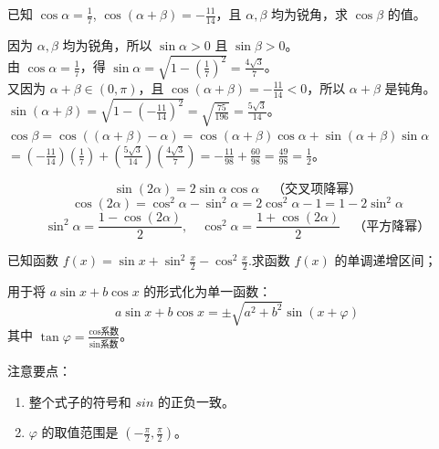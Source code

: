 \begin{example}
    已知 $\cos\alpha = \frac{1}{7}$, $\cos(\alpha+\beta)=-\frac{11}{14}$，且 $\alpha, \beta$ 均为锐角，求 $\cos\beta$ 的值。
\end{example}
\begin{solution}
    因为 $\alpha, \beta$ 均为锐角，所以 $\sin\alpha > 0$ 且 $\sin\beta > 0$。\\
    由 $\cos\alpha = \frac{1}{7}$，得 $\sin\alpha = \sqrt{1 - (\frac{1}{7})^2} = \frac{4\sqrt{3}}{7}$。\\
    又因为 $\alpha+\beta \in (0, \pi)$，且 $\cos(\alpha+\beta)=-\frac{11}{14} < 0$，所以 $\alpha+\beta$ 是钝角。\\
    $\sin(\alpha+\beta) = \sqrt{1 - (-\frac{11}{14})^2} = \sqrt{\frac{75}{196}} = \frac{5\sqrt{3}}{14}$。\\
    $\cos\beta = \cos((\alpha+\beta)-\alpha) = \cos(\alpha+\beta)\cos\alpha + \sin(\alpha+\beta)\sin\alpha$
    $= (-\frac{11}{14})(\frac{1}{7}) + (\frac{5\sqrt{3}}{14})(\frac{4\sqrt{3}}{7}) = -\frac{11}{98} + \frac{60}{98} = \frac{49}{98} = \frac{1}{2}$。
\end{solution}
\vspace{2em}


\begin{theorem}[二倍角公式与降幂公式]
    $$ \sin(2\alpha) = 2\sin\alpha\cos\alpha \quad \text{（交叉项降幂）}$$
    $$ \cos(2\alpha) = \cos^2\alpha - \sin^2\alpha = 2\cos^2\alpha - 1 = 1 - 2\sin^2\alpha $$
    $$ \sin^2\alpha = \frac{1-\cos(2\alpha)}{2}, \quad \cos^2\alpha = \frac{1+\cos(2\alpha)}{2} \quad \text{（平方降幂）}$$
\end{theorem}

\begin{example}
    已知函数 $f(x)=\sin x+\sin ^2 \frac{x}{2}-\cos ^2 \frac{x}{2}$.求函数 $f(x)$ 的单调递增区间；
\end{example}

\vspace{2em}

\begin{theorem}[辅助角公式]
    用于将 $a\sin x + b\cos x$ 的形式化为单一函数：
    $$ a\sin x + b\cos x = \pm \sqrt{a^2+b^2} \sin(x + \varphi) $$
    其中 $\tan\varphi = \frac{\text{cos系数}}{\text{sin系数}}$。

    注意要点：
    \begin{enumerate}
        \item 整个式子的符号和 $sin$ 的正负一致。
        \item $\varphi$ 的取值范围是 $(-\frac{\pi}{2}, \frac{\pi}{2})$。
    \end{enumerate}
\end{theorem}

